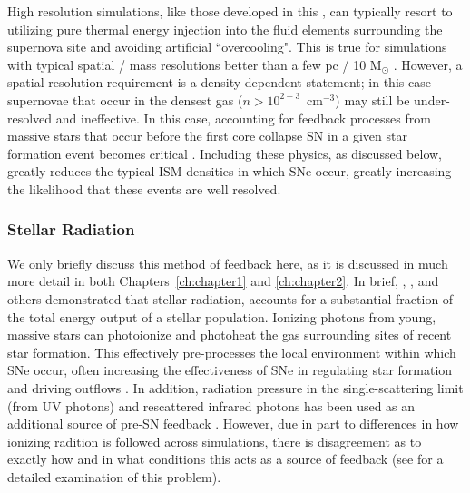 High resolution simulations, like those developed in this \dissertation, can typically resort to utilizing pure thermal energy injection into the fluid elements surrounding the supernova site and avoiding artificial ``overcooling". This is true for simulations with typical spatial / mass resolutions better than a few pc / 10 M$_{\odot}$ \citep{Simpson2015,Hu2018,Smith2018b}. However, a spatial resolution requirement is a density dependent statement; in this case supernovae that occur in the densest gas ($n > 10^{2-3}$~cm$^{-3}$) may still be under-resolved and ineffective. In this case, accounting for feedback processes from massive stars that occur before the first core collapse SN in a given star formation event becomes critical \citep{Hu2016}. Including these physics, as discussed below, greatly reduces the typical ISM densities in which SNe occur, greatly increasing the likelihood that these events are well resolved.

\subsubsection{Stellar Radiation}
\label{intro:sec:radiation}

We only briefly discuss this method of feedback here, as it is discussed in much more detail in both Chapters~\ref{ch:chapter1} and \ref{ch:chapter2}. In brief, \cite{Leitherer1999}, \cite{Agertz2013}, and others demonstrated that stellar radiation, accounts for a substantial fraction of the total energy output of a stellar population. Ionizing photons from young, massive stars can photoionize and photoheat the gas surrounding sites of recent star formation. This effectively pre-processes the local environment within which SNe occur, often increasing the effectiveness of SNe in regulating star formation and driving outflows \citep{Hu2016}. In addition, radiation pressure in the single-scattering limit (from UV photons) and rescattered infrared photons has been used as an additional source of pre-SN feedback \citep[e.g.][]{FIRE}. However, due in part to differences in how ionizing radition is followed across simulations, there is disagreement as to exactly how and in what conditions this acts as a source of feedback (see \cite{Krumholz2018} for a detailed examination of this problem).

